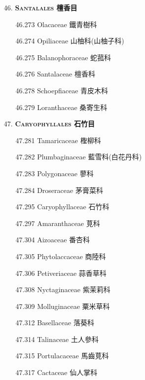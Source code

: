 \begin{enumerate}
  \item[46. ] \textbf{\textsc{Santalales} 檀香目} 
    \begin{enumerate}
      \item[46.273] Olacaceae 鐵青樹科  
        
      \item[46.274] Opiliaceae 山柚科(山柚子科)  
        
      \item[46.275] Balanophoraceae 蛇菰科  
        
      \item[46.276] Santalaceae 檀香科  
        
      \item[46.278] Schoepfiaceae 青皮木科  
        
      \item[46.279] Loranthaceae 桑寄生科  
        
    \end{enumerate}
  \item[47. ] \textbf{\textsc{Caryophyllales} 石竹目} 
    \begin{enumerate}
      \item[47.281] Tamaricaceae 檉柳科  
        
      \item[47.282] Plumbaginaceae 藍雪科(白花丹科)  
        
      \item[47.283] Polygonaceae 蓼科  
        
      \item[47.284] Droseraceae 茅膏菜科  
        
      \item[47.295] Caryophyllaceae 石竹科  
        
      \item[47.297] Amaranthaceae 莧科  
        
      \item[47.304] Aizoaceae 番杏科  
        
      \item[47.305] Phytolaccaceae 商陸科  
        
      \item[47.306] Petiveriaceae 蒜香草科  
        
      \item[47.308] Nyctaginaceae 紫茉莉科  
        
      \item[47.309] Molluginaceae 粟米草科  
        
      \item[47.312] Basellaceae 落葵科  
        
      \item[47.314] Talinaceae 土人參科  
        
      \item[47.315] Portulacaceae 馬齒莧科  
        
      \item[47.317] Cactaceae 仙人掌科  
        
    \end{enumerate}
\end{enumerate}
